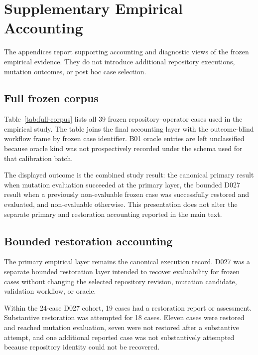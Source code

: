 \appendix

\section{Supplementary Empirical Accounting}
\label{app:supplementary}

The appendices report supporting accounting and diagnostic views of the frozen
empirical evidence. They do not introduce additional repository executions,
mutation outcomes, or post hoc case selection.

\subsection{Full frozen corpus}
\label{app:full-corpus}

Table~\ref{tab:full-corpus} lists all 39 frozen repository--operator cases used
in the empirical study. The table joins the final accounting layer with the
outcome-blind workflow frame by frozen case identifier. B01 oracle entries are
left unclassified because oracle kind was not prospectively recorded under the
schema used for that calibration batch.

The displayed outcome is the combined study result: the canonical primary
result when mutation evaluation succeeded at the primary layer, the bounded
D027 result when a previously non-evaluable frozen case was successfully
restored and evaluated, and non-evaluable otherwise. This presentation does
not alter the separate primary and restoration accounting reported in the main
text.



\subsection{Bounded restoration accounting}
\label{app:d027}

The primary empirical layer remains the canonical execution record. D027 was a
separate bounded restoration layer intended to recover evaluability for frozen
cases without changing the selected repository revision, mutation candidate,
validation workflow, or oracle.

Within the 24-case D027 cohort, 19 cases had a restoration report or assessment.
Substantive restoration was attempted for 18 cases. Eleven cases were restored
and reached mutation evaluation, seven were not restored after a substantive
attempt, and one additional reported case was not substantively attempted
because repository identity could not be recovered.

